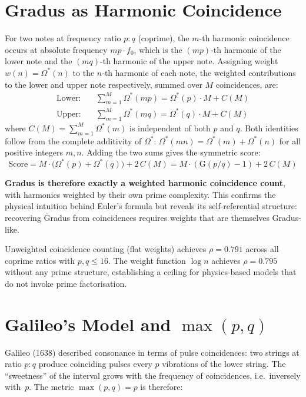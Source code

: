 \documentclass[11pt,a4paper]{article}
\newcommand{\Os}{\Omega^{*}}
\newcommand{\G}{\mathrm{G}}
\begin{document}
\section{Gradus as Harmonic Coincidence}

For two notes at frequency ratio $p:q$ (coprime), the $m$-th harmonic
coincidence occurs at absolute frequency $mp \cdot f_0$, which is the
$(mp)$-th harmonic of the lower note and the $(mq)$-th harmonic of the upper
note. Assigning weight $w(n) = \Os(n)$ to the $n$-th harmonic of each note,
the weighted contributions to the lower and upper note respectively, summed
over $M$ coincidences, are:
\begin{align*}
  \text{Lower:} &\quad \sum_{m=1}^{M} \Os(m p) = \Os(p)\cdot M + C(M) \\
  \text{Upper:} &\quad \sum_{m=1}^{M} \Os(m q) = \Os(q)\cdot M + C(M)
\end{align*}
where $C(M) = \sum_{m=1}^{M} \Os(m)$ is independent of both $p$ and $q$.
Both identities follow from the complete additivity of $\Os$:
$\Os(mn) = \Os(m) + \Os(n)$ for all positive integers $m, n$.
Adding the two sums gives the symmetric score:
\[
  \text{Score} = M \cdot \bigl(\Os(p) + \Os(q)\bigr) + 2\,C(M)
               = M \cdot (\G(p/q) - 1) + 2\,C(M)
\]

\textbf{Gradus is therefore exactly a weighted harmonic coincidence count},
with harmonics weighted by their own prime complexity. This confirms the
physical intuition behind Euler's formula but reveals its self-referential
structure: recovering Gradus from coincidences requires weights that are
themselves Gradus-like.

Unweighted coincidence counting (flat weights) achieves $\rho = 0.791$ across
all coprime ratios with $p, q \leq 16$. The weight function $\log n$ achieves
$\rho = 0.795$ without any prime structure, establishing a ceiling for
physics-based models that do not invoke prime factorisation.


\section{Galileo's Model and \texorpdfstring{$\max(p,q)$}{max(p,q)}}

Galileo (1638) described consonance in terms of pulse coincidences: two strings
at ratio $p:q$ produce coinciding pulses every $p$ vibrations of the lower
string. The ``sweetness'' of the interval grows with the frequency of
coincidences, i.e.\ inversely with~$p$. The metric $\max(p,q) = p$ is
therefore:
\end{document}

